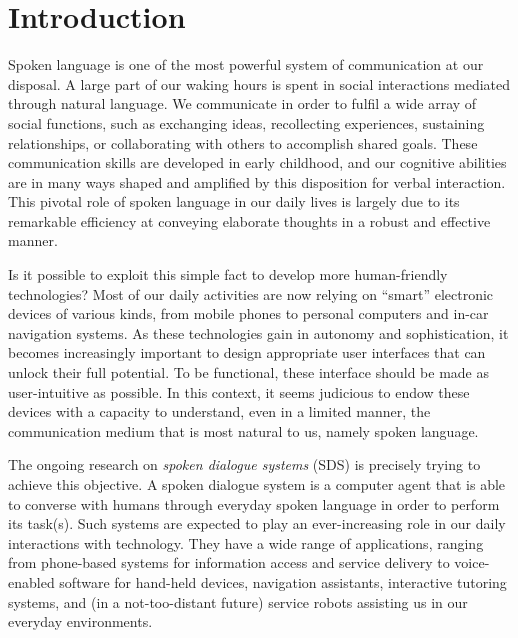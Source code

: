 
\chapter{Introduction}

Spoken language is one of the most powerful system of communication at our disposal. A large part of our waking hours is spent in social interactions mediated through natural language.  We communicate in order to fulfil a wide array of social functions, such as exchanging ideas, recollecting experiences,  sustaining relationships, or collaborating with others to accomplish shared goals. These communication skills are developed in early childhood, and our cognitive abilities are in many ways shaped and amplified by this disposition for verbal interaction.  This pivotal role of spoken language in our daily lives is largely due to its remarkable efficiency at conveying elaborate thoughts in a robust and effective manner. 

Is it possible to exploit this simple fact to develop more human-friendly technologies? Most of our daily activities are now relying on ``smart'' electronic devices of various kinds, from mobile phones to personal computers and in-car navigation systems. As these technologies gain in autonomy and sophistication, it becomes increasingly important to design appropriate user interfaces that can unlock their full potential.  To be functional, these interface should be made as user-intuitive as possible. In this context, it seems judicious to endow these devices with a capacity to understand, even in a limited manner, the communication medium that is most natural to us, namely spoken language.  

The ongoing research on \textit{spoken dialogue systems} (SDS) is precisely trying to achieve this objective. A spoken dialogue system is a computer agent that is able to converse with humans through everyday spoken language in order to perform its task(s). Such systems are expected to play an ever-increasing role in our daily interactions with technology. They have a wide range of applications, ranging from phone-based systems for information access and service delivery to voice-enabled software for hand-held devices, navigation assistants, interactive tutoring systems, and (in a not-too-distant future) service robots assisting us in our everyday environments.

